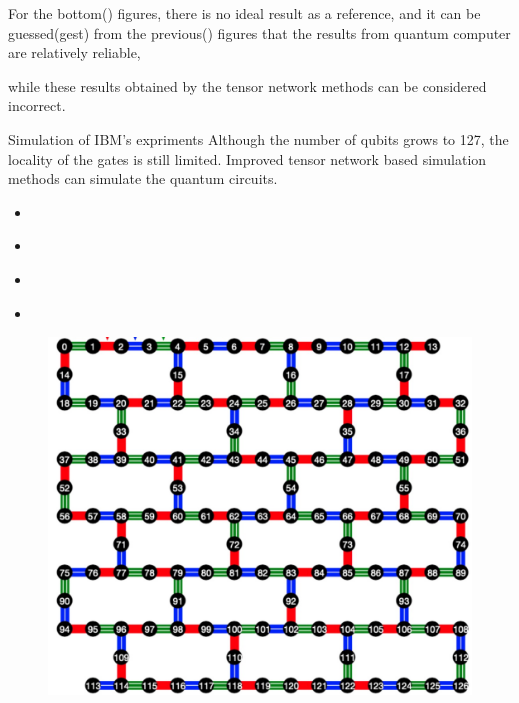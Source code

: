 \documentclass[10pt]{beamer}
\begin{document}
\begin{CJK}{UTF8}{gbsn}
{ For the bottom() figures, there is no ideal result as a reference, and it can be guessed(gest) from the previous() figures that the results from quantum computer are relatively reliable, 
 
 while these results obtained by the tensor network methods can be considered incorrect.


}

\begin{frame}[fragile]{Simulation of IBM's expriments}
 Although the number of qubits grows to 127, the locality of the gates is still limited. Improved tensor network based simulation methods can simulate the quantum circuits.

  \begin{minipage}{0.45\textwidth}
    \begin{itemize}
      \item \cite{tindall2023efficient} 
      \item \cite{beguvsic2024fast}
      \item \cite{liao2023simulation}
      \item \cite{patra2024efficient}
    \end{itemize}
  \end{minipage}
  \hfill
  \begin{minipage}{0.5\textwidth}
    \begin{figure}
      \centering
      \includegraphics[width=\textwidth]{fig/ibm3.jpg}
    \end{figure}
  \end{minipage}


\end{frame}
\end{CJK}
\end{document}
